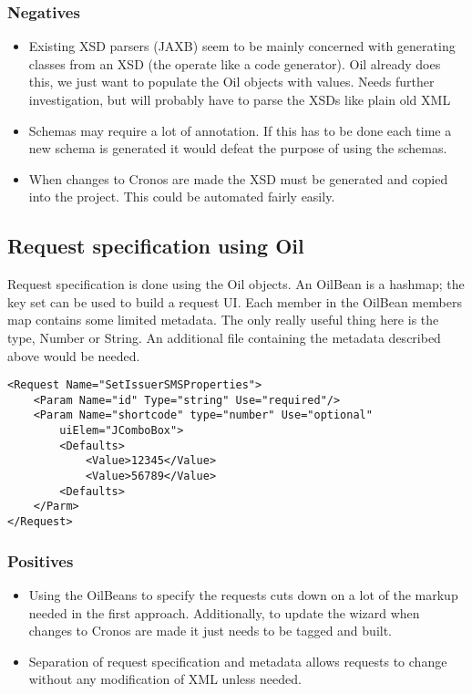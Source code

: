 \documentclass[a4paper, 11pt, titlepage]{article}
\begin{document}
		\subsubsection{Negatives}
		\begin{itemize}
		\item Existing XSD parsers (JAXB) seem to be mainly concerned with generating classes from an XSD (the operate like a code generator). Oil already does this, we just want to populate the Oil objects with values. Needs further investigation, but will probably have to parse the XSDs like plain old XML
		\item Schemas may require a lot of annotation. If this has to be done each time a new schema is generated it would defeat the purpose of using the schemas.
		\item When changes to Cronos are made the XSD must be generated and copied into the project. This could be automated fairly easily.
		\end{itemize}
	\subsection{Request specification using Oil}
Request specification is done using the Oil objects. An OilBean is a hashmap; the key set can be used to build a request UI. Each member in the OilBean members map contains some limited metadata. The only really useful thing here is the type, Number or String. An additional file containing the metadata described above would be needed.
	\begin{verbatim}
<Request Name="SetIssuerSMSProperties">
    <Param Name="id" Type="string" Use="required"/>
    <Param Name="shortcode" type="number" Use="optional" 
        uiElem="JComboBox">
        <Defaults>
            <Value>12345</Value>
            <Value>56789</Value>
        <Defaults>
    </Parm>
</Request>

	\end{verbatim}

		\subsubsection{Positives}
		\begin{itemize}
		\item Using the OilBeans to specify the requests cuts down on a lot of the markup needed in the first approach. Additionally, to update the wizard when changes to Cronos are made it just needs to be tagged and built.
		\item Separation of request specification and metadata allows requests to change without any modification of XML unless needed.
		\end{itemize}
\end{document}
